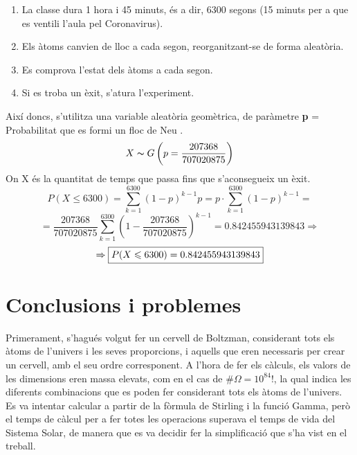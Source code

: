 \documentclass[12pt]{report}
\begin{document}
\begin{enumerate}
    \item La classe dura 1 hora i 45 minuts, és a dir, 6300 segons (15 minuts per a que es ventili l'aula pel Coronavirus).
    \item Els àtoms canvien de lloc a cada segon, reorganitzant-se de forma aleatòria.
    \item Es comprova l'estat dels àtoms a cada segon.
    \item Si es troba un èxit, s'atura l'experiment.
\end{enumerate}
Així doncs, s'utilitza una variable aleatòria geomètrica, de paràmetre \textbf{p} = Probabilitat que es formi un floc de Neu .
\textbf{$$X  \thicksim G \left( p = \frac{207368}{707020875} \right)$$}
On X és la quantitat de temps que passa fins que s'aconsegueix un èxit.
\begin{equation*}
    P(X  \leqslant  6300) = \sum_{k=1}^{6300}(1-p)^{k-1}p = p\cdot \sum_{k=1}^{6300}(1-p)^{k-1}=
\end{equation*}
\begin{equation*}
    =\frac{207368}{707020875} \sum_{k=1}^{6300} \left(1-\frac{207368}{707020875} \right)^{k-1}     =0.842455943139843 \Rightarrow
\end{equation*}
\begin{equation}
     \Rightarrow\fcolorbox{black}{white}{$ P(X  \leqslant  6300)=0.842455943139843$} 
\end{equation}

\chapter{Conclusions i problemes}
Primerament, s'hagués volgut fer un cervell de Boltzman, considerant tots els àtoms de \hspace{1em} l’univers i les seves proporcions, i aquells que eren necessaris per crear un cervell, amb el seu ordre corresponent. A l'hora de fer els càlculs, els valors de les dimensions eren massa elevats, com en el cas de $\#\Omega = 10^{84}!$, la qual indica les diferents combinacions que es poden fer considerant tots els àtoms de l'univers. Es va intentar calcular a partir de la fòrmula de Stirling i la funció Gamma, però el temps de càlcul per a fer totes les operacions superava el temps de vida del Sistema Solar, de manera que es va decidir fer la simplificació que s'ha vist en el treball.\newline
\end{document}
